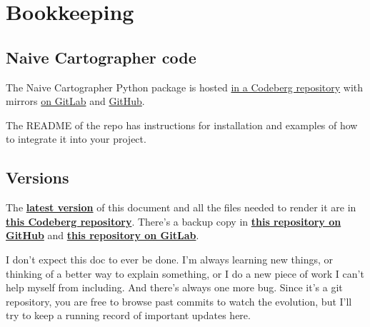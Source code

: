 \section{Bookkeeping}
\label{sec:bookkeeping}

\subsection{Naive Cartographer code}
\label{subsec:code}

The Naive Cartographer Python package is hosted
\href{
https://codeberg.org/brohrer/cartographer
}{in a Codeberg repository}
with mirrors
\href{
https://gitlab.com/brohrer/cartographer
}{on GitLab} and
\href{
https://github.com/brohrer/cartographer
}{GitHub}.

The README of the repo has instructions for installation and
examples of how to integrate it into your project.

\subsection{Versions}
\label{subsec:versions}

The \textbf{\href{
https://codeberg.org/brohrer/cartographer-paper/src/branch/main/cartographer.pdf}
{latest version}}
of this document and all the files needed to
render it are in \textbf{\href{
https://codeberg.org/brohrer/cartographer-paper}
{this Codeberg repository}}. There's a backup copy in \textbf{
\href{https://github.com/brohrer/cartographer-paper}
{this repository on GitHub}} and 
 \textbf{
\href{https://gitlab.com/brohrer/cartographer-paper}
{this repository on GitLab}}.

I don't expect this doc to ever be done. I'm always learning new things,
or thinking of a better way to explain something, or I do a new
piece of work I can't help myself from including. And there's always
one more bug.
Since it's a git repository, you are free to browse past commits to watch
the evolution, but I'll try to keep a running record of important updates
here.



